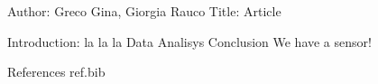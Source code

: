 Author: Greco Gina, Giorgia Rauco
Title: Article

Introduction: la la la
Data
Analisys
Conclusion We have a sensor!


References
ref.bib
